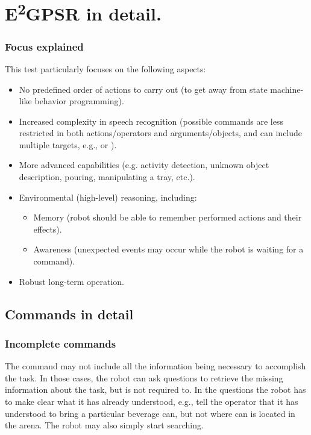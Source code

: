 \chapter[EEGPSR in detail]{E\textsuperscript{2}GPSR in detail.}
\label{chap:eegpsr-appendix}

\subsection{Focus explained}
\label{sec:eegpsr-focus-details}
This test particularly focuses on the following aspects:
\begin{itemize}
	\item No predefined order of actions to carry out (to get away from state machine-like behavior programming).

	\item Increased complexity in speech recognition (possible commands are less restricted in both actions/operators and arguments/objects, and can include multiple targets, e.g.,  or ).

	\item More advanced capabilities (e.g. activity detection, unknown object description, pouring, manipulating a tray, etc.).

	\item Environmental (high-level) reasoning, including:
  \begin{itemize}
	\item Memory (robot should be able to remember performed actions and their effects).
	\item Awareness (unexpected events may occur while the robot is waiting for a command).
  \end{itemize}

  \item Robust long-term operation.

\end{itemize}

\section{Commands in detail}
\label{sec:eegpsr-commands-details}

\subsection{Incomplete commands} The command may not include all the information being necessary to accomplish the task. In those cases, the robot can ask questions to retrieve the missing information about the task, but is not required to. In the questions the robot has to make clear what it has already understood, e.g., tell the operator that it has understood to bring a particular beverage can, but not where can is located in the arena. The robot may also simply start searching.

